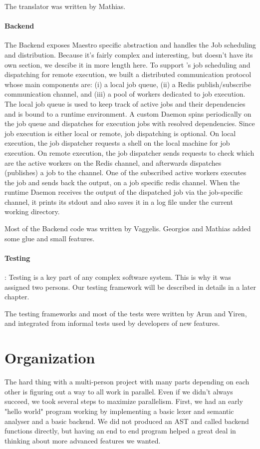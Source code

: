 The translator was written by Mathias.

\paragraph{Backend}

The Backend exposes Maestro specific abstraction and handles the Job scheduling and distribution.
Because it's fairly complex and interesting,  but doesn't have its own section, we descibe it in more length here.
To support \lang{}'s job scheduling and dispatching for remote execution, we
built a distributed communication protocol whose main components are: (i)
a local job queue, (ii) a Redis
publish/subscribe communication channel, and (iii) a pool of workers dedicated
to job execution. The local job queue is used to keep track of active jobs
and their dependencies and is bound to a runtime environment. A custom Daemon
spins periodically on the job queue and dispatches for execution jobs with
resolved dependencies. Since job execution is either local or remote, job
dispatching is optional. On local execution, the job dispatcher requests a
shell on the local machine for job execution. On remote execution, the job
dispatcher sends requests to check which are the active workers on the Redis
channel, and afterwards dispatches (publishes) a job to the channel. One of the
subscribed active workers executes the job and sends back the output, on a job
specific redis channel. When the runtime Daemon receives the output of the
dispatched job via the job-specific channel, it prints its stdout and also
saves it in a log file under the current working directory.

Most of the Backend code was written by Vaggelis. Georgios and Mathias added some glue and small features.

\paragraph{Testing}:
Testing is a key part of any complex software system.
This is why it was assigned two persons.
Our testing framework will be described in details in a later chapter.

The testing frameworks and most of the tests were written by Arun and Yiren, and integrated from informal tests used by developers of new features.


\section{Organization}
The hard thing with a multi-person project with many parts depending on each other is figuring out a way to all work in parallel.
Even if we didn't always succeed, we took several steps to maximize parallelism.
First, we had an early "hello world" program working by implementing a basic lexer and semantic analyser and a basic backend.
We did not produced an AST and called backend functions directly, but having an end to end program helped a great deal in thinking about more advanced features we wanted.


